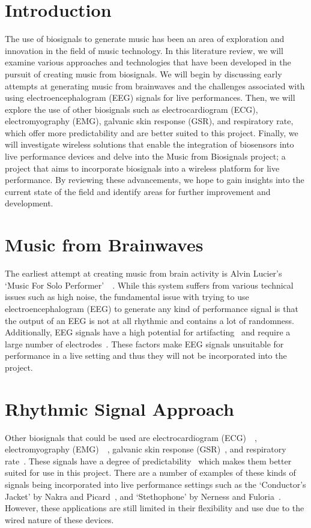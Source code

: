 \section{Introduction}
The use of biosignals to generate music has been an area of exploration and innovation in the field of music technology.
In this literature review, we will examine various approaches and technologies that have been developed in the pursuit of creating music from biosignals.
We will begin by discussing early attempts at generating music from brainwaves
and the challenges associated with using electroencephalogram (EEG) signals for live performances.
Then, we will explore the use of other biosignals such as electrocardiogram (ECG), electromyography (EMG), galvanic skin response (GSR), and respiratory rate,
which offer more predictability and are better suited to this project.
Finally, we will investigate wireless solutions that enable the integration of biosensors into live performance devices and
delve into the Music from Biosignals project; a project that aims to incorporate biosignals into a wireless platform for live performance.
By reviewing these advancements, we hope to gain insights into the current state of the field and identify areas for further improvement and development.

\section{Music from Brainwaves}
The earliest attempt at creating music from brain activity is Alvin Lucier's `Music For Solo Performer'~\cite{Lucier:2010}~\cite{Straebel:2014}.
While this system suffers from various technical issues such as high noise,
the fundamental issue with trying to use electroencephalogram (EEG) to generate any kind of performance signal
is that the output of an EEG is not at all rhythmic and contains a lot of randomness.
Additionally, EEG signals have a high potential for artifacting~\cite{Mannan:2018} and require a large number of electrodes~\cite{Piorecky:2019}.
These factors make EEG signals unsuitable for performance in a live setting and thus they will not be incorporated into the project.

\section{Rhythmic Signal Approach}
Other biosignals that could be used are electrocardiogram (ECG)~\cite{Afonso:1999}~\cite{Pan:1985},
electromyography (EMG)~\cite{Tanaka:2002}~\cite{Young:2013}, galvanic skin response (GSR)~\cite{Kurniawan:2013}, and respiratory rate~\cite{Carlos:2011}.
These signals have a degree of predictability~\cite{Tahiroğlu:2008} which makes them better suited for use in this project.
There are a number of examples of these kinds of signals being incorporated into live performance settings such as
the `Conductor's Jacket' by Nakra and Picard~\cite{Nakra:1998}, and `Stethophone' by Nerness and Fuloria~\cite{Nerness:2019}.
However, these applications are still limited in their flexibility and use due to the wired nature of these devices.

